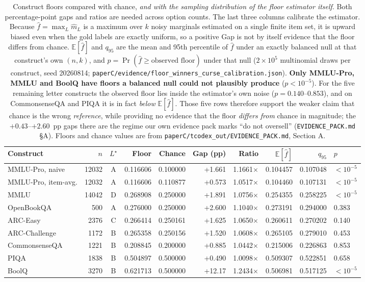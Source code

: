 \begin{table}[t]
\centering
\footnotesize
\setlength{\tabcolsep}{2.4pt}
\begin{tabular}{lrcrrrrrrl}
\toprule
Construct & $n$ & $L^\star$ & Floor & Chance & Gap (pp) & Ratio & $\mathbb{E}[\hat f]$ & $q_{95}$ & $p$ \\
\midrule
MMLU-Pro, naive & 12032 & A & 0.116606 & 0.100000 & +1.661 & 1.1661$\times$ & 0.104457 & 0.107048 & $<10^{-5}$ \\
MMLU-Pro, item-avg. & 12032 & A & 0.116606 & 0.110877 & +0.573 & 1.0517$\times$ & 0.104460 & 0.107131 & $<10^{-5}$ \\
MMLU & 14042 & D & 0.268908 & 0.250000 & +1.891 & 1.0756$\times$ & 0.254355 & 0.258225 & $<10^{-5}$ \\
OpenBookQA & 500 & A & 0.276000 & 0.250000 & +2.600 & 1.1040$\times$ & 0.273191 & 0.294000 & 0.383 \\
ARC-Easy & 2376 & C & 0.266414 & 0.250161 & +1.625 & 1.0650$\times$ & 0.260611 & 0.270202 & 0.140 \\
ARC-Challenge & 1172 & B & 0.265358 & 0.250156 & +1.520 & 1.0608$\times$ & 0.265105 & 0.279010 & 0.453 \\
CommonsenseQA & 1221 & B & 0.208845 & 0.200000 & +0.885 & 1.0442$\times$ & 0.215006 & 0.226863 & 0.853 \\
PIQA & 1838 & B & 0.504897 & 0.500000 & +0.490 & 1.0098$\times$ & 0.509307 & 0.522851 & 0.658 \\
BoolQ & 3270 & B & 0.621713 & 0.500000 & +12.17 & 1.2434$\times$ & 0.506981 & 0.517125 & $<10^{-5}$ \\
\bottomrule
\end{tabular}
\caption{Construct floors compared with chance, \emph{and with the sampling distribution of the
floor estimator itself}. Both percentage-point gaps and ratios are needed across option counts.
The last three columns calibrate the estimator. Because $\hat f=\max_L \hat m_L$ is a maximum over
$k$ noisy marginals estimated on a single finite item set, it is upward biased even when the gold
labels are exactly uniform, so a positive Gap is not by itself evidence that the floor differs from
chance. $\mathbb{E}[\hat f]$ and $q_{95}$ are the mean and 95th percentile of $\hat f$ under an
exactly balanced null at that construct's own $(n,k)$, and $p=\Pr(\hat f\ge\text{observed floor})$
under that null ($2\times10^{5}$ multinomial draws per construct, seed 20260814;
\texttt{paperC/evidence/floor\_winners\_curse\_calibration.json}). \textbf{Only MMLU-Pro, MMLU and
BoolQ have floors a balanced null could not plausibly produce} ($p<10^{-5}$). For the five
remaining letter constructs the observed floor lies inside the estimator's own noise
($p=0.140$--$0.853$), and on CommonsenseQA and PIQA it is in fact \emph{below} $\mathbb{E}[\hat f]$.
Those five rows therefore support the weaker claim that chance is the wrong \emph{reference},
while providing no evidence that the floor \emph{differs from} chance in magnitude; the
$+0.43$--$+2.60$~pp gaps there are the regime our own evidence pack marks ``do not oversell''
(\texttt{EVIDENCE\_PACK.md} \S A). Floors and chance values are from
\texttt{paperC/tcodex\_out/EVIDENCE\_PACK.md}, Section A.}
\label{tab:nulls}
\end{table}
